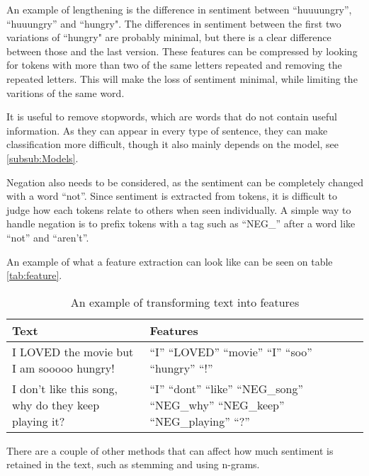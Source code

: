 An example of lengthening is the difference in sentiment between ``huuuungry'',
``huuungry'' and ``hungry". The differences in sentiment between the first two
variations of ``hungry" are probably minimal, but there is a clear difference
between those and the last version. These features can be compressed by looking
for tokens with more than two of the same letters repeated and removing the
repeated letters. This will make the loss of sentiment minimal, while limiting
the varitions of the same word.\nl

It is useful to remove stopwords, which are words that do not contain useful
information. As they can appear in every type of sentence, they can make
classification more difficult, though it also mainly depends on the model,
see \autoref{subsub:Models}.\nl

Negation also needs to be considered, as the sentiment can be completely changed
with a word ``not''. Since sentiment is extracted from tokens, it is difficult
to judge how each tokens relate to others when seen individually. A simple way
to handle negation is to prefix tokens with a tag such as ``NEG\_'' after a
word like ``not'' and ``aren't''.\nl

An example of what a feature extraction can look like can be seen on table
\autoref{tab:feature}.

\begin{table}[H]
\centering
\begin{tabular}{|p{6cm}|p{8cm}|}
\hline
Text & Features \\ \hline
I LOVED the movie but I am sooooo hungry! & 
``I'' ``LOVED'' ``movie'' ``I'' ``soo'' ``hungry'' ``!''
\\ \hline 
I don't like this song, why do they keep playing it? &
``I'' ``dont'' ``like'' ``NEG\_song'' ``NEG\_why'' ``NEG\_keep'' ``NEG\_playing''
``?'' \\ \hline
\end{tabular}
\caption{An example of transforming text into features}
\label{tab:feature}
\end{table}

There are a couple of other methods that can affect how much sentiment is
retained in the text, such as stemming and using n-grams.

